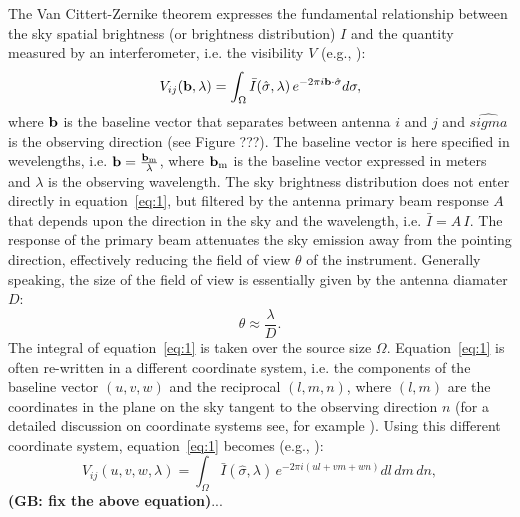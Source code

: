 The Van Cittert-Zernike theorem expresses the fundamental relationship between the sky spatial brightness (or brightness distribution) $I$ and the quantity measured by an interferometer, i.e. the visibility $V$ (e.g., \cite{TMS}):
\begin{equation}
V_{ij} ({\bf b}, \lambda) = \int_\Omega {\bar I} (\hat{\sigma}, \lambda) \, e^{-2 \pi i {\bf b} \cdot {\hat \sigma}} d {\bf \sigma},
\label{eq:1}
\end{equation}
where ${\bf b}$ is the baseline vector that separates between antenna $i$ and $j$ and $\hat{sigma}$ is the observing direction (see Figure ???). The baseline vector is here specified in wevelengths, i.e. ${\bf b} = \frac{{\bf b_{\rm m}}}{\lambda}$, where ${\bf b_{\rm m}}$ is the baseline vector expressed in meters and $\lambda$ is the observing wavelength.
The sky brightness distribution does not enter directly in equation~\ref{eq:1}, but filtered by the antenna primary beam response $A$ that depends upon the direction in the sky and the wavelength, i.e. ${\bar I} = A  \, I$. The response of the primary beam attenuates the sky emission away from the pointing direction, effectively reducing the field of view $\theta$ of the instrument. Generally speaking, the size of the field of view is essentially given by the antenna diamater $D$: 
\begin{equation}
\theta \approx \frac{\lambda}{D}.
\label{eq:2}
\end{equation}
The integral of equation~\ref{eq:1} is taken over the source size $\Omega$. Equation~\ref{eq:1} is often re-written in a different coordinate system, i.e. the components of the baseline vector $(u,v,w)$ and the reciprocal $(l,m,n)$, where $(l,m)$ are the coordinates in the plane on the sky tangent to the observing direction $n$ (for a detailed discussion on coordinate systems see, for example \cite{TMS}). Using this different coordinate system, equation~\ref{eq:1} becomes (e.g., \cite{TMS}):
\begin{equation}
V_{ij} (u,v,w, \lambda) = \int_\Omega {\bar I} (\hat{\sigma}, \lambda) \, e^{-2 \pi i (ul + vm + wn)} dl \, dm \, dn,
\label{eq:3}
\end{equation}
{\bf (GB: fix the above equation)}...

